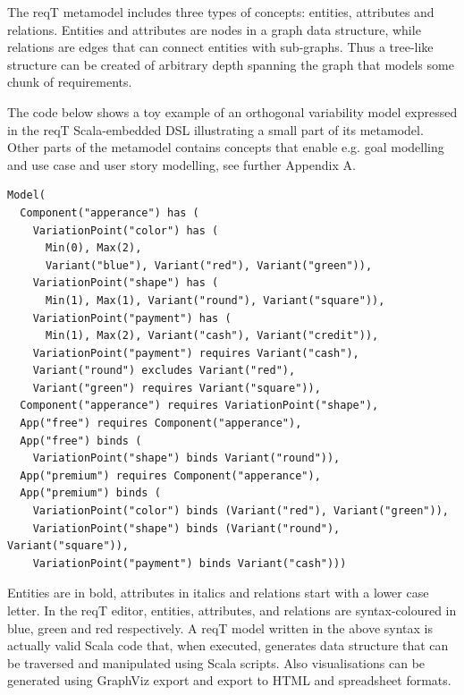 \documentclass[a4paper]{llncs}
\begin{document}
The reqT metamodel includes three types of concepts: entities, attributes and relations. Entities and attributes are nodes in a graph data structure, while relations are edges that can connect entities with sub-graphs. Thus a tree-like structure can be created of arbitrary depth spanning the graph that models some chunk of requirements. 

The code below shows a toy example of an orthogonal variability model \cite{metzger2007variability} expressed in the reqT Scala-embedded DSL \cite{Regnell2013} illustrating a small part of its metamodel. Other parts of the metamodel contains concepts that enable e.g. goal modelling %
and use case and user story modelling, see further Appendix A.

\begin{spacing}{0.8}
\begingroup
    \fontsize{8pt}{12pt}\selectfont
\begin{lstlisting}
Model(
  Component("apperance") has (
    VariationPoint("color") has (
      Min(0), Max(2),
      Variant("blue"), Variant("red"), Variant("green")),
    VariationPoint("shape") has (
      Min(1), Max(1), Variant("round"), Variant("square")),
    VariationPoint("payment") has (
      Min(1), Max(2), Variant("cash"), Variant("credit")),
    VariationPoint("payment") requires Variant("cash"), 
    Variant("round") excludes Variant("red"),
    Variant("green") requires Variant("square")),
  Component("apperance") requires VariationPoint("shape"), 
  App("free") requires Component("apperance"),  
  App("free") binds (
    VariationPoint("shape") binds Variant("round")),
  App("premium") requires Component("apperance"),  
  App("premium") binds ( 
    VariationPoint("color") binds (Variant("red"), Variant("green")),
    VariationPoint("shape") binds (Variant("round"), Variant("square")),
    VariationPoint("payment") binds Variant("cash")))
\end{lstlisting}
\endgroup
\end{spacing}
\noindent Entities are in bold, attributes in italics and relations start with a lower case letter. In the reqT editor, entities, attributes, and relations are syntax-coloured in blue, green and red respectively. A reqT model written in the above syntax is actually valid Scala code that, when executed, generates data structure that can be traversed and manipulated using Scala scripts. Also visualisations can be generated using GraphViz export and export to HTML and spreadsheet formats. 
\end{document}
